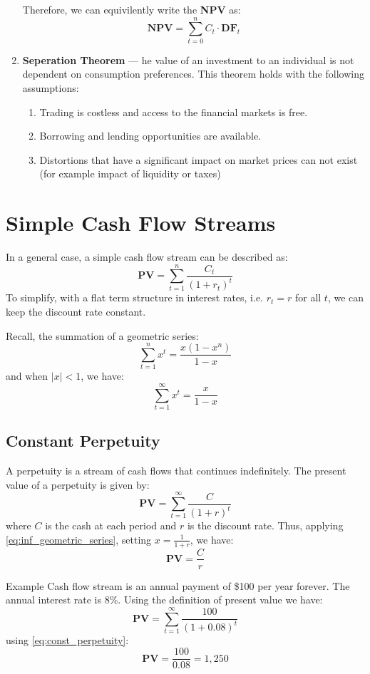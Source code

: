\begin{enumerate}[I]
		Therefore, we can equivilently write the \textbf{NPV} as:
		$$
		\textbf{NPV} = \sum_{t=0}^{n} C_t \cdot \textbf{DF}_t
		$$
	\item \textbf{Seperation Theorem} — he value of an investment to an individual is not dependent on consumption preferences. This theorem holds with the following assumptions:
		\begin{enumerate}[i]
			\item Trading is costless and access to the financial markets is free.
			\item Borrowing and lending opportunities are available.
			\item Distortions that have a significant impact on market prices can not exist (for example impact of liquidity or taxes)
		\end{enumerate}
\end{enumerate}
\section{Simple Cash Flow Streams}
In a general case, a simple cash flow stream can be described as:
$$
\textbf{PV} = \sum_{t=1}^{n} \frac{C_t}{(1 + r_t)^t}
$$
To simplify, with a flat term structure in interest rates, i.e. $r_t = r$ for all $t$, we can keep the discount rate constant.

Recall, the summation of a geometric series:
\begin{equation}\label{eq:geometric_series}
\sum_{t=1}^{n} x^t = \frac{x(1 - x^n)}{1 - x}
\end{equation}
and when $|x| < 1$, we have:
\begin{equation}\label{eq:inf_geometric_series}
\sum_{t=1}^{\infty} x^t = \frac{x}{1 - x}
\end{equation}
\subsection{Constant Perpetuity}
A perpetuity is a stream of cash flows that continues indefinitely. The present value of a perpetuity is given by:
$$
\textbf{PV} = \sum_{t=1}^{\infty} \frac{C}{(1 + r)^t}
$$
where $C$ is the cash at each period and $r$ is the discount rate. Thus, applying \eqref{eq:inf_geometric_series}, setting $x = \frac{1}{1 + r}$, we have:
\begin{equation}\label{eq:const_perpetuity}
\textbf{PV} = \frac{C}{r}
\end{equation}
\begin{examplebox}{Example}
	Cash flow stream is an annual payment of \$100 per year forever. The annual interest rate is 8\%. Using the definition of present value we have:
	$$
	\textbf{PV} = \sum_{t=1}^{\infty} \frac{100}{(1 + 0.08)^t}
	$$
	using \eqref{eq:const_perpetuity}:
	$$
	\textbf{PV} = \frac{100}{0.08} = 1,250
	$$
\end{examplebox}
